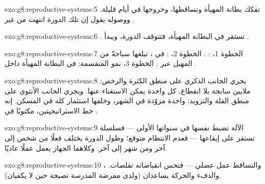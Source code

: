 \begin{solution}{exo:g8:reproductive-systems:5}
تفكك بطانة  المهيأة وتساقطها، وخروجها في أيام
قليلة. ووصوله يقول إن تلك الدورة انتهت من غير .
\end{solution}

\begin{solution}{exo:g8:reproductive-systems:6}
. تستقر  في البطانة المهيأة، فتتوقف
الدورة، ويبدأ .
\end{solution}

\begin{solution}{exo:g8:reproductive-systems:7}
الخطوة 1، :  . الخطوة 2،
: في ، تبلغها  سباحةً من المهبل
عبر . الخطوة 3، نمو  المنقسمة: في البطانة
المهيأة داخل .
\end{solution}

\begin{solution}{exo:g8:reproductive-systems:8}
يجري الجانب الذكري على منطق الكثرة والرخص: ملايين سابحة
بلا انقطاع، كل واحدة يمكن الاستغناء عنها. ويجري الجانب
الأنثوي على منطق القلة والتزويد:  واحدة مزوّدة في
الشهر، وخلفها استثمار  كله في المسكن. إنه خط
الاستراتيجيتين، مكتوبًا في .
\end{solution}

\begin{solution}{exo:g8:reproductive-systems:9}
الآلة تضبط نفسها في سنواتها الأولى --- فسلسلة 
تستقر على إيقاعها --- فعدم الانتظام متوقع؛ وطول الدورة
يختلف فعلًا من شخص إلى آخر ومن شهر إلى آخر. وكلاهما
الجهاز يعمل عملًا عاديًا.
\end{solution}

\begin{solution}{exo:g8:reproductive-systems:10}
 ، والتساقط عمل عضلي --- فتحس انقباضاته
تقلصات. والدفء والحركة يساعدان (ولدى ممرضة المدرسة
نصيحة حين لا يكفيان).
\end{solution}

